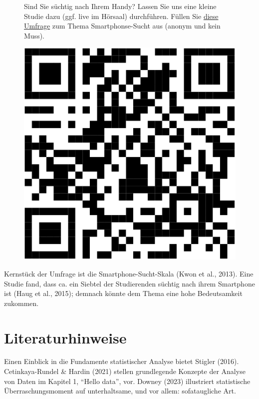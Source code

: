 \documentclass[
  letterpaper,
  twoside,
  open=any]{scrbook}
\theoremstyle{definition}
\theoremstyle{definition}
\theoremstyle{definition}
\theoremstyle{remark}
\begin{document}
\begin{figure}

\begin{minipage}{0.80\linewidth}
Sind Sie süchtig nach Ihrem Handy? Lassen Sie uns eine kleine Studie
dazu (ggf. live im Hörsaal) durchführen. Füllen Sie
\href{https://forms.gle/PP8yb6Ubqq3JU78F9}{diese Umfrage} zum Thema
Smartphonse-Sucht aus (anonym und kein Muss).\end{minipage}%
%
\begin{minipage}{0.20\linewidth}

\begin{center}
\includegraphics[width=0.75\linewidth,height=\textheight,keepaspectratio]{010-rahmen_files/figure-pdf/qr-google-forms-handysucht-1.pdf}
\end{center}

\end{minipage}%

\end{figure}%

Kernstück der Umfrage ist die Smartphone-Sucht-Skala (Kwon et al.,
2013). Eine Studie fand, dass ca. ein Siebtel der Studierenden süchtig
nach ihrem Smartphone ist (Haug et al., 2015); demnach könnte dem Thema
eine hohe Bedeutsamkeit zukommen.

\section{Literaturhinweise}\label{literaturhinweise}

Einen Einblick in die Fundamente statistischer Analyse bietet Stigler
(2016). Cetinkaya-Rundel \& Hardin (2021) stellen grundlegende Konzepte
der Analyse von Daten im Kapitel 1, \enquote{Hello data}, vor. Downey
(2023) illustriert statistische Überraschungsmoment auf unterhaltsame,
und vor allem: sofataugliche Art.
\end{document}
